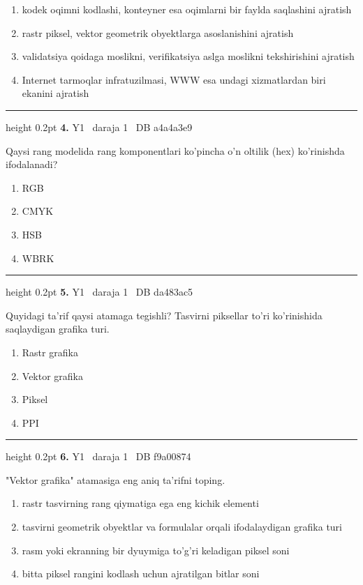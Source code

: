 \documentclass[10pt,a4paper,oneside]{article}
\begin{document}
\begin{enumerate}[label=\Alph*),leftmargin=9mm]
\item kodek oqimni kodlashi, konteyner esa oqimlarni bir faylda saqlashini ajratish
\item rastr piksel, vektor geometrik obyektlarga asoslanishini ajratish
\item validatsiya qoidaga moslikni, verifikatsiya aslga moslikni tekshirishini ajratish
\item Internet tarmoqlar infratuzilmasi, WWW esa undagi xizmatlardan biri ekanini ajratish
\end{enumerate}
\vspace{2mm}\hrule height 0.2pt \vspace{4mm}
\hypertarget{q4}{\textbf{\color{ink}4.}}  {\color{muted}\scriptsize Y1 \textbullet\ daraja 1 \textbullet\ DB a4a4a3e9}
\par
Qaysi rang modelida rang komponentlari ko'pincha o'n oltilik (hex) ko'rinishda ifodalanadi?
\begin{enumerate}[label=\Alph*),leftmargin=9mm]
\item RGB
\item CMYK
\item HSB
\item WBRK
\end{enumerate}
\vspace{2mm}\hrule height 0.2pt \vspace{4mm}
\hypertarget{q5}{\textbf{\color{ink}5.}}  {\color{muted}\scriptsize Y1 \textbullet\ daraja 1 \textbullet\ DB da483ac5}
\par
Quyidagi ta'rif qaysi atamaga tegishli? Tasvirni piksellar to'ri ko'rinishida saqlaydigan grafika turi.
\begin{enumerate}[label=\Alph*),leftmargin=9mm]
\item Rastr grafika
\item Vektor grafika
\item Piksel
\item PPI
\end{enumerate}
\vspace{2mm}\hrule height 0.2pt \vspace{4mm}
\hypertarget{q6}{\textbf{\color{ink}6.}}  {\color{muted}\scriptsize Y1 \textbullet\ daraja 1 \textbullet\ DB f9a00874}
\par
"Vektor grafika" atamasiga eng aniq ta'rifni toping.
\begin{enumerate}[label=\Alph*),leftmargin=9mm]
\item rastr tasvirning rang qiymatiga ega eng kichik elementi
\item tasvirni geometrik obyektlar va formulalar orqali ifodalaydigan grafika turi
\item rasm yoki ekranning bir dyuymiga to'g'ri keladigan piksel soni
\item bitta piksel rangini kodlash uchun ajratilgan bitlar soni
\end{enumerate}
\end{document}
